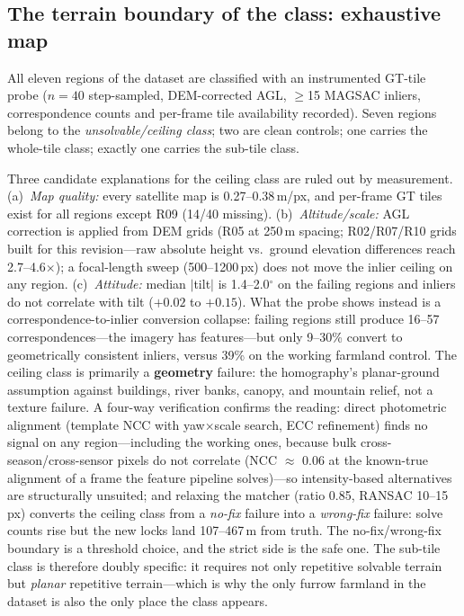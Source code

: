 \documentclass[journal]{IEEEtran}
\begin{document}
\subsection{The terrain boundary of the class: exhaustive map}
\label{sec:boundary}

All eleven regions of the dataset are classified with an instrumented GT-tile probe ($n=40$ step-sampled, DEM-corrected AGL, $\geq$15 MAGSAC inliers, correspondence counts and per-frame tile availability recorded). Seven regions belong to the \emph{unsolvable/ceiling class}; two are clean controls; one carries the whole-tile class; exactly one carries the sub-tile class.


Three candidate explanations for the ceiling class are ruled out by measurement. (a)~\emph{Map quality:} every satellite map is 0.27--0.38\,m/px, and per-frame GT tiles exist for all regions except R09 (14/40 missing). (b)~\emph{Altitude/scale:} AGL correction is applied from DEM grids (R05 at 250\,m spacing; R02/R07/R10 grids built for this revision---raw absolute height vs.\ ground elevation differences reach 2.7--4.6$\times$); a focal-length sweep (500--1200\,px) does not move the inlier ceiling on any region. (c)~\emph{Attitude:} median $|$tilt$|$ is 1.4--2.0$^{\circ}$ on the failing regions and inliers do not correlate with tilt ($+0.02$ to $+0.15$). What the probe shows instead is a correspondence-to-inlier conversion collapse: failing regions still produce 16--57 correspondences---the imagery has features---but only 9--30\% convert to geometrically consistent inliers, versus 39\% on the working farmland control. The ceiling class is primarily a \textbf{geometry} failure: the homography's planar-ground assumption against buildings, river banks, canopy, and mountain relief, not a texture failure. A four-way verification confirms the reading: direct photometric alignment (template NCC with yaw$\times$scale search, ECC refinement) finds no signal on any region---including the working ones, because bulk cross-season/cross-sensor pixels do not correlate (NCC $\approx$ 0.06 at the known-true alignment of a frame the feature pipeline solves)---so intensity-based alternatives are structurally unsuited; and relaxing the matcher (ratio 0.85, RANSAC 10--15\,px) converts the ceiling class from a \emph{no-fix} failure into a \emph{wrong-fix} failure: solve counts rise but the new locks land 107--467\,m from truth. The no-fix/wrong-fix boundary is a threshold choice, and the strict side is the safe one. The sub-tile class is therefore doubly specific: it requires not only repetitive solvable terrain but \emph{planar} repetitive terrain---which is why the only furrow farmland in the dataset is also the only place the class appears.
\end{document}
